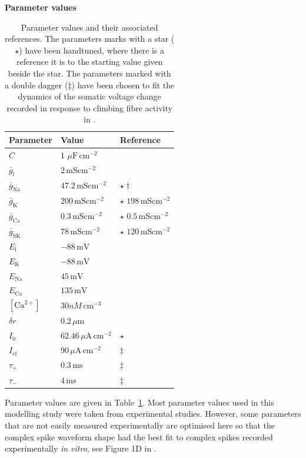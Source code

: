 \documentclass[twocolumn]{svjour3}          %
\newcommand{\mv}{\,\mathrm{mV}}
\newcommand{\msi}{\,\mathrm{mS cm^{-2}}}
\newcommand{\mse}{\,\mathrm{ms}}
\newcommand{\cm}{\,\mathrm{cm}}
\renewcommand{\k}{\mathrm{K}}
\newcommand{\ca}{\mathrm{Ca}}
\newcommand{\na}{\mathrm{Na}}
\newcommand{\sk}{\mathrm{SK}}
\newcommand{\leak}{\mathrm{l}}
\begin{document}
\begin{table}[!t]
\centering
\textbf{Parameter values}
\begin{center}
\begin{tabular}{|l l l|}
\hline
Parameter & Value & Reference \\ \hline
$C$&1 $\mu\mathrm{F}\,\mathrm{cm}^{-2}$& \citep{RothHausser2001}\\ \hline
$\bar{g}_\leak$&$2\msi$& \citep{RappEtAl1994}\\ \hline
$\bar{g}_\na$&$47.2\msi$&  $\star\dagger$\\ \hline
$\bar{g}_\k$ &$200\msi$& $\star$ $198\msi$ \citep{AkemannKnopfel2006}\\ \hline
$\bar{g}_\ca$&$0.3\msi$& $\star$ $0.5\msi$ \citep{MiyashoEtAl2001} \\ \hline
$\bar{g}_\sk$&$78\msi$& $\star$ $120\msi$ \citep{RubinCleland2006}\\ \hline
$E_\leak$&$-88\mv$& \citep{MasoliEtAl2015}\\ \hline
$E_\k$&$-88\mv$& \citep{MasoliEtAl2015}\\ \hline
$E_\na$&$45\mv$& \citep{DeSchutterBower1994a}\\ \hline
$E_\ca$&$135\mv$& \citep{DeSchutterBower1994a}\\ \hline
$[\ca^{2+}]$&$30 nM\cm^{-3}$& \citep{KanoEtAl1995}\\ \hline
$\delta r$&$0.2\,\mu\mathrm{m}$& \\ \hline
$I_0$&$62.46\,\mu\mathrm{A}\cm^{-2}$& $\star$\\ \hline
$I_{\mathrm{cf}}$&$90\,\mu\mathrm{A}\cm^{-2}$& $\ddagger$\citep{StuartHausser1994}\\ \hline
$\tau_+$&$0.3\mse$&  $\ddagger$\citep{StuartHausser1994}\\ \hline
$\tau_-$&$4\mse$& $\ddagger$\citep{StuartHausser1994}\\ \hline
\end{tabular}
\end{center}
\caption{Parameter values and their associated references. The
  parameters marks with a star ($\star$) have been handtuned, where
  there is a reference it is to the starting value given beside the
  star. The parameters marked with a double dagger ($\ddagger$) have
  been chosen to fit the dynamics of the somatic voltage change
  recorded in response to climbing fibre activity in
  \protect\citet{DavieEtAl2008}.}
\label{table1}
\end{table}


Parameter values are given in Table~\ref{table1}. Most parameter
values used in this modelling study were taken from experimental
studies. However, some parameters that are not easily measured
experimentally are optimised here so that the complex spike waveform
shape had the best fit to complex spikes recorded experimentally
\textit{in vitro}, see Figure 1D in \citet{DavieEtAl2008}.
\end{document}
